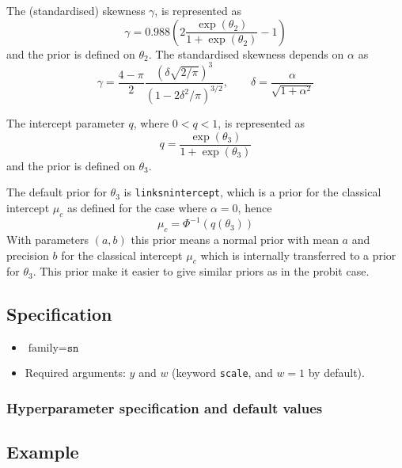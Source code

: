 \documentclass[a4paper,11pt]{article}
\begin{document}
The (standardised) skewness $\gamma$, is represented as
\begin{displaymath}
    \gamma=0.988 (2\frac{\exp(\theta_2)}{1+\exp(\theta_2)}-1)
\end{displaymath}
and the prior is defined on $\theta_{2}$. The standardised skewness
depends on $\alpha$ as
\begin{displaymath}
\gamma ={\frac  {4-\pi }{2}}{\frac{\left(\delta {\sqrt  {2/\pi
              }}\right)^{3}}{\left(1-2\delta^{2}/\pi
        \right)^{{3/2}}}}, \qquad
    \delta ={\frac{\alpha}{{\sqrt{1+\alpha^{2}}}}}
\end{displaymath}

The intercept parameter $q$, where $0<q<1$, is represented as
\begin{displaymath}
    q=\frac{\exp(\theta_3)}{1+\exp(\theta_3)}
\end{displaymath}
and the prior is defined on $\theta_3$.

The default prior for $\theta_3$ is \texttt{linksnintercept}, which is
a prior for the classical intercept $\mu_c$ as defined for the case
where $\alpha=0$, hence
\begin{displaymath}
    \mu_c =  \Phi^{-1}(q(\theta_3))
\end{displaymath}
With parameters $(a,b)$ this prior means a normal prior with mean $a$
and precision $b$ for the classical intercept $\mu_c$ which is
internally transferred to a prior for $\theta_3$. This prior make it
easier to give similar priors as in the probit case.


\subsection*{Specification}

\begin{itemize}
\item $\text{family}=\texttt{sn}$
\item Required arguments: $y$ and $w$ (keyword \texttt{scale}, and 
    $w=1$ by default).
\end{itemize}

\subsubsection*{Hyperparameter specification and default values}



\subsection*{Example}
\end{document}
